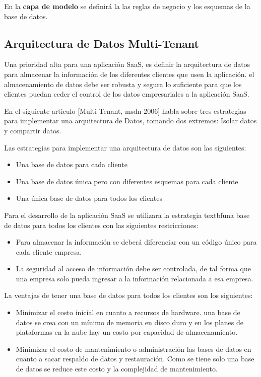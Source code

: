 \noindent En la \textbf{capa de modelo} se definirá la las reglas de negocio y los esquemas de la base de datos. 

\subsection{Arquitectura de Datos Multi-Tenant}
\noindent Una prioridad alta para una aplicación SaaS, es definir la arquitectura de datos para almacenar la información de los diferentes clientes que usen la aplicación. el almacenamiento de datos debe ser robusta y segura lo suficiente para que los clientes puedan ceder el control de los datos empresariales a la aplicación SaaS.

\noindent En el siguiente articulo [Multi Tenant, msdn 2006] habla sobre tres estrategias para implementar una arquitectura de Datos, tomando dos extremos: Isolar datos y compartir datos.

\noindent Las estrategias para implementar una arquitectura de datos son las siguientes:
\begin{itemize}
\item Una base de datos para cada cliente 
\item Una base de datos única pero con diferentes esquemas para cada cliente
\item Una única base de datos para todos los clientes
\end{itemize}

\noindent Para el desarrollo de la aplicación SaaS se utilizara la estrategia textbf{una base de datos para todos los clientes} con las siguientes restricciones:
\begin{itemize}
\item Para almacenar la información se deberá diferenciar con un código único para cada cliente empresa.
\item La seguridad al acceso de información debe ser controlada, de tal forma que una empresa solo pueda ingresar a la información relacionada a esa empresa.
\end{itemize}

\noindent La ventajas de tener una base de datos para todos los clientes son los siguientes:
\begin{itemize}
\item Minimizar el costo inicial en cuanto a recursos de hardware. una base de datos se crea con un mínimo de memoria en disco duro y en los planes de plataformas en la nube hay un costo por capacidad de almacenamiento.
\item Minimizar el costo de mantenimiento o administración las bases de datos en cuanto a sacar respaldo de datos y restauración. Como se tiene solo una base de datos se reduce este costo y la complejidad de mantenimiento.  
\end{itemize}


